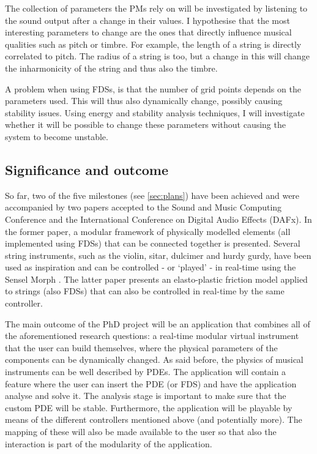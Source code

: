 The collection of parameters the PMs rely on will be investigated by listening to the sound output after a change in their values. I hypothesise that the most interesting parameters to change are the ones that directly influence musical qualities such as pitch or timbre. For example, the length of a string is directly correlated to pitch. The radius of a string is too, but a change in this will change the inharmonicity of the string and thus also the timbre.

A problem when using FDSs, is that the number of grid points depends on the parameters used. This will thus also dynamically change, possibly causing stability issues. Using energy and stability analysis techniques, I will investigate whether it will be possible to change these parameters without causing the system to become unstable.

\subsection{Significance and outcome}
So far, two of the five milestones (see \ref{sec:plans}) have been achieved and were accompanied by two papers accepted to the Sound and Music Computing Conference and the International Conference on Digital Audio Effects (DAFx). In the former paper, a modular framework of physically modelled elements (all implemented using FDSs) that can be connected together is presented. Several string instruments, such as the violin, sitar, dulcimer and hurdy gurdy, have been used as inspiration and can be controlled - or ‘played’ - in real-time using the Sensel Morph \cite{Sensel2019}. The latter paper presents an elasto-plastic friction model applied to strings (also FDSs) that can also be controlled in real-time by the same controller. 

The main outcome of the PhD project will be an application that combines all of the aforementioned research questions: a real-time modular virtual instrument that the user can build themselves, where the physical parameters of the components can be dynamically changed. As said before, the physics of musical instruments can be well described by PDEs. The application will contain a feature where the user can insert the PDE (or FDS) and have the application analyse and solve it. The analysis stage is important to make sure that the custom PDE will be stable. Furthermore, the application will be playable by means of the different controllers mentioned above (and potentially more). The mapping of these will also be made available to the user so that also the interaction is part of the modularity of the application.

